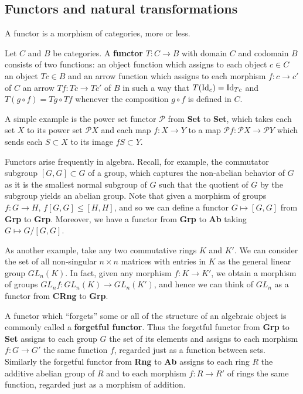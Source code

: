 \documentclass{../../mathnotes}
\begin{document}
\subsection*{Functors and natural transformations}

A functor is a morphism of categories, more or less.

\begin{defn}
    Let $C$ and $B$ be categories. A \textbf{functor} $T:C\to B$ with domain $C$ and codomain $B$ consists of two functions:
    an object function which assigns to each object $c\in C$ an object $Tc\in B$ and an arrow function which assigns
    to each morphism $f:c\to c'$ of $C$ an arrow $Tf:Tc\to Tc'$ of $B$ in such a way that $T(\operatorname{Id}_c)=\operatorname{Id}_{Tc}$ and
    $T(g\circ f)=Tg\circ Tf$ whenever the composition $g\circ f$ is defined in $C$.
\end{defn}

\begin{exmp}
    A simple example is the power set functor $\mathcal{P}$ from \textbf{Set} to \textbf{Set}, which takes each set $X$
    to its power set $\mathcal{P}X$ and each map $f:X\to Y$ to a map $\mathcal{P}f:\mathcal{P}X\to\mathcal{P}Y$ which
    sends each $S\subset X$ to its image $fS\subset Y$. 
\end{exmp}

\begin{exmp}
    Functors arise frequently in algebra. Recall, for example, the commutator subgroup $[G,G]\subset G$ of a group,
    which captures the non-abelian behavior of $G$ as it is the smallest normal subgroup of $G$ such that the quotient of $G$
    by the subgroup yields an abelian group. Note that given a morphism of groups $f:G\to H$, $f[G,G]\leqslant [H,H]$, and
    so we can define a functor $G\mapsto [G,G]$ from \textbf{Grp} to \textbf{Grp}. Moreover, we have a functor from \textbf{Grp}
    to \textbf{Ab} taking $G\mapsto G/[G,G]$.

    As another example, take any two commutative rings $K$ and $K'$. We can consider the set of all non-singular
    $n\times n$ matrices with entries in $K$ as the general linear group $GL_n(K)$. In fact, given any morphism
    $f:K\to K'$, we obtain a morphism of groups $GL_nf:GL_n(K)\to GL_n(K')$, and hence we can think of $GL_n$ as a functor
    from \textbf{CRng} to \textbf{Grp}.

    A functor which ``forgets'' some or all of the structure of an algebraic object is commonly called a
    \textbf{forgetful functor}. Thus the forgetful functor from \textbf{Grp} to \textbf{Set} assigns to each
    group $G$ the set of its elements and assigns to each morphism $f:G\to G'$ the same function $f$, regarded just as
    a function between sets. Similarly the forgetful functor from \textbf{Rng} to \textbf{Ab} assigns to each
    ring $R$ the additive abelian group of $R$ and to each morphism $f:R\to R'$ of rings the same function,
    regarded just as a morphism of addition.
\end{exmp}
\end{document}
